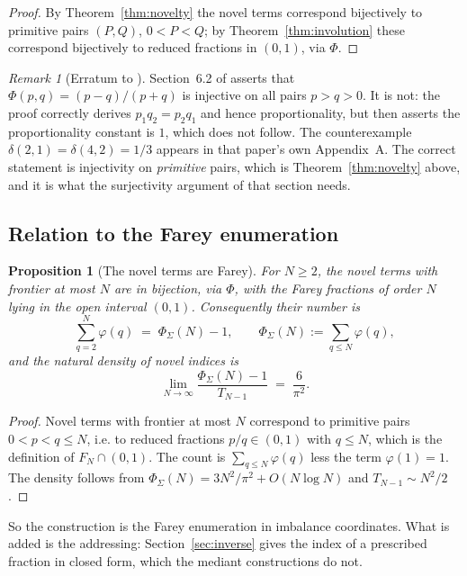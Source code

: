 \documentclass[11pt,a4paper]{article}
\theoremstyle{plain}
\newtheorem{proposition}[theorem]{Proposition}
\theoremstyle{definition}
\theoremstyle{remark}
\newtheorem{remark}[theorem]{Remark}
\begin{document}
\begin{proof}
By Theorem~\ref{thm:novelty} the novel terms correspond bijectively to primitive
pairs $(P,Q)$, $0 < P < Q$; by Theorem~\ref{thm:involution} these correspond
bijectively to reduced fractions in $(0,1)$, via $\Phi$.
\end{proof}

\begin{remark}[Erratum to \cite{Bilokon2025}]\label{rem:erratum}
Section~6.2 of \cite{Bilokon2025} asserts that
$\Phi(p,q) = (p-q)/(p+q)$ is injective on all pairs $p > q > 0$. It is not: the
proof correctly derives $p_1 q_2 = p_2 q_1$ and hence proportionality, but then
asserts the proportionality constant is $1$, which does not follow. The
counterexample $\delta(2,1) = \delta(4,2) = 1/3$ appears in that paper's own
Appendix~A. The correct statement is injectivity on \emph{primitive} pairs,
which is Theorem~\ref{thm:novelty} above, and it is what the surjectivity
argument of that section needs.
\end{remark}

\subsection{Relation to the Farey enumeration}

\begin{proposition}[The novel terms are Farey]\label{prop:farey}
For $N \ge 2$, the novel terms with frontier at most $N$ are in bijection, via
$\Phi$, with the Farey fractions of order $N$ lying in the open interval
$(0,1)$. Consequently their number is
\[
  \sum_{q=2}^{N} \varphi(q) \;=\; \Phi_\Sigma(N) - 1,
  \qquad \Phi_\Sigma(N) := \sum_{q \le N} \varphi(q) ,
\]
and the natural density of novel indices is
\[
  \lim_{N \to \infty} \frac{\Phi_\Sigma(N)-1}{T_{N-1}}
  \;=\; \frac{6}{\pi^2}.
\]
\end{proposition}

\begin{proof}
Novel terms with frontier at most $N$ correspond to primitive pairs
$0 < p < q \le N$, i.e. to reduced fractions $p/q \in (0,1)$ with $q \le N$,
which is the definition of $F_N \cap (0,1)$. The count is
$\sum_{q\le N}\varphi(q)$ less the term $\varphi(1) = 1$. The density follows
from $\Phi_\Sigma(N) = 3N^2/\pi^2 + O(N\log N)$ and $T_{N-1} \sim N^2/2$.
\end{proof}

So the construction is the Farey enumeration in imbalance coordinates. What is
added is the addressing: Section~\ref{sec:inverse} gives the index of a
prescribed fraction in closed form, which the mediant constructions do not.
\end{document}
